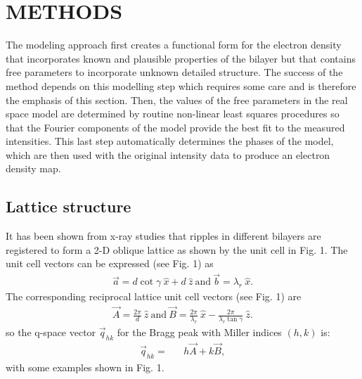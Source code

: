 \section{METHODS}

The modeling approach first creates a functional form for the electron density 
that incorporates known and plausible properties of the bilayer but that
contains free parameters to incorporate unknown detailed structure.
The success of the method depends on this modelling step which requires some care
and is therefore the emphasis of this section.
Then, the values of the free parameters in the real space model are 
determined by routine non-linear least squares procedures so that the Fourier
components of the model provide the best fit to the measured intensities.
This last step automatically determines the phases of the model, which are
then used with the original intensity data to produce an electron density map.

\subsection{Lattice structure}

It has been shown from x-ray studies \cite{Tar73,JanSS79,Ino80,Ale85,%
Wac89a,Kat95} that ripples in different bilayers are registered to form a 
2-D oblique lattice as shown by the unit cell in Fig. 1.
The unit cell vectors can be expressed (see Fig. 1) as
\begin{eqnarray}
\label{realunit}
\vec{a} = d \cot \gamma\ \hat{x} + d\ \hat{z} \ \mbox{and}\ \vec{b} = \lambda_r\ \hat{x}.
\end{eqnarray}
The corresponding reciprocal lattice unit cell vectors (see Fig. 1) are 
\begin{eqnarray}
\label{reciunit}
\vec{A} = \frac{2 \pi}{d}\ \hat{z}\ \mbox{and}\ \vec{B} = \frac{2 \pi}{\lambda_r}\ \hat{x} - \frac{2 \pi}{\lambda_r \tan \gamma}\ \hat{z}.
\end{eqnarray}
so the q-space vector $\vec{q}_{hk}$ for the Bragg peak with Miller indices $(h,k)$
is:
\begin{eqnarray}
\label{qvector}
\vec{q}_{hk} =&& h \vec{A} + k \vec{B} ,
\end{eqnarray}
with some examples shown in Fig. 1.
